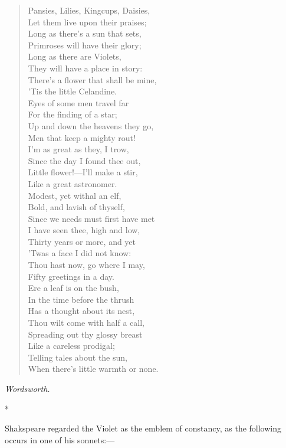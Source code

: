 \documentclass[11pt,twoside]{article}
\newcommand\stars{\begin{center}*\quad*\quad*\end{center}}
\newcommand\by[1]{\par\hfill\textit{#1}\par}
\begin{document}
\begin{verse}
Pansies, Lilies, Kingcups, Daisies,\\
Let them live upon their praises;\\
Long as there’s a sun that sets,\\
\quad Primroses will have their glory;\\
Long as there are Violets,\\
\quad They will have a place in story:\\
There’s a flower that shall be mine,\\
’Tis the little Celandine.\\
Eyes of some men travel far\\
For the finding of a star;\\
Up and down the heavens they go,\\
\quad Men that keep a mighty rout!\\
I’m as great as they, I trow,\\
\quad Since the day I found thee out,\\
Little flower!---I’ll make a stir,\\
Like a great astronomer.\\
Modest, yet withal an elf,\\
Bold, and lavish of thyself,\\
Since we needs must first have met\\
\quad I have seen thee, high and low,\\
Thirty years or more, and yet\\
\quad ’Twas a face I did not know:\\
Thou hast now, go where I may,\\
Fifty greetings in a day.\\
Ere a leaf is on the bush,\\
In the time before the thrush\\
Has a thought about its nest,\\
\quad Thou wilt come with half a call,\\
Spreading out thy glossy breast\\
\quad Like a careless prodigal;\\
Telling tales about the sun,\\
When there’s little warmth or none.
\end{verse}

\by{Wordsworth.}

\stars

Shakspeare regarded the Violet as the emblem of constancy, as the following occurs in one of his sonnets:---
\end{document}
